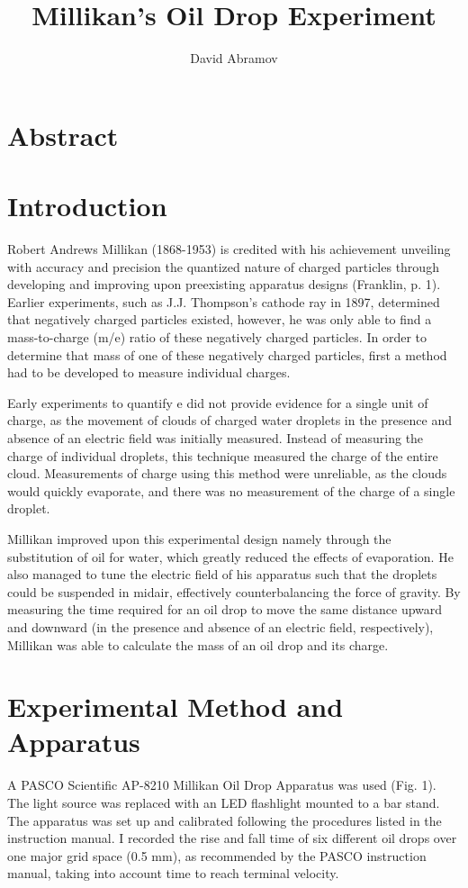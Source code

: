 \documentclass[11pt, oneside]{article}   	%
\title{Millikan's Oil Drop Experiment}
\author{David Abramov}
\begin{document}
\maketitle

\section{Abstract}
	
\section{Introduction}
	Robert Andrews Millikan (1868-1953) is credited with his achievement unveiling with accuracy and precision the quantized nature of charged particles through developing and improving upon preexisting apparatus designs (Franklin, p. 1). Earlier experiments, such as J.J. Thompson's cathode ray in 1897, determined that negatively charged particles existed, however, he was only able to find a mass-to-charge (m/e) ratio of these negatively charged particles. In order to determine that mass of one of these negatively charged particles, first a method had to be developed to measure individual charges.
	
	Early experiments to quantify e did not provide evidence for a single unit of charge, as the movement of clouds of charged water droplets in the presence and absence of an electric field was initially measured. Instead of measuring the charge of individual droplets, this technique measured the charge of the entire cloud. Measurements of charge using this method were unreliable, as the clouds would quickly evaporate, and there was no measurement of the charge of a single droplet. 
	
	Millikan improved upon this experimental design namely through the substitution of oil for water, which greatly reduced the effects of evaporation. He also managed to tune the electric field of his apparatus such that the droplets could be suspended in midair, effectively counterbalancing the force of gravity. By measuring the time required for an oil drop to move the same distance upward and downward (in the presence and absence of an electric field, respectively), Millikan was able to calculate the mass of an oil drop and its charge.
\section{Experimental Method and Apparatus}

	A PASCO Scientific AP-8210 Millikan Oil Drop Apparatus was used (Fig. 1). The light source was replaced with an LED flashlight mounted to a bar stand. The apparatus was set up and calibrated following the procedures listed in the instruction manual. I recorded the rise and fall time of six different oil drops over one major grid space (0.5 mm), as recommended by the PASCO instruction manual, taking into account time to reach terminal velocity.
\end{document}
